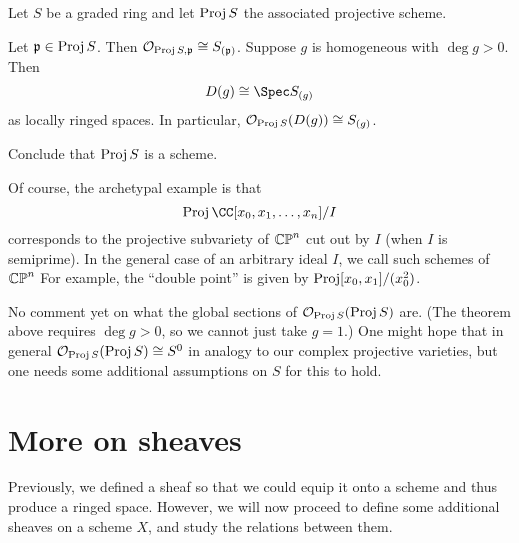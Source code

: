 \documentclass[11pt]{scrreprt}
\begin{document}
\begin{theorem}
	Let $S$ be a graded ring and let $\operatorname{Proj} S$ the associated projective scheme.
	\begin{enumerate}[(a)]
		\ii Let $\mathfrak p \in \operatorname{Proj} S$.
		Then $\mathcal O_{\operatorname{Proj} S, \mathfrak p} \cong S_{(\mathfrak p)}$.
		\ii Suppose $g$ is homogeneous with $\deg g > 0$. Then
		\[ D(g) \cong \Spec S_{(g)} \]
		as locally ringed spaces.
		In particular, $\mathcal O_{\operatorname{Proj} S}(D(g)) \cong S_{(g)}$.
	\end{enumerate}
\end{theorem}
\begin{ques}
	Conclude that $\operatorname{Proj} S$ is a scheme.
\end{ques}

Of course, the archetypal example is that
\[ \Proj \CC[x_0, x_1, \dots, x_n] / I \]
corresponds to the projective subvariety of $\mathbb{CP}^n$
cut out by $I$ (when $I$ is semiprime).
In the general case of an arbitrary ideal $I$, we
call such schemes  of $\mathbb{CP}^n$
For example, the ``double point'' is given by $\operatorname{Proj}[x_0,x_1]/(x_0^2)$.

\begin{remark}
	No comment yet on what the global sections of $\mathcal O_{\operatorname{Proj} S}(\operatorname{Proj} S)$ are.
	(The theorem above requires $\deg g > 0$, so we cannot just take $g=1$.)
	One might hope that in general $\mathcal O_{\operatorname{Proj} S}(\operatorname{Proj} S) \cong S^0$
	in analogy to our complex projective varieties, but
	one needs some additional assumptions on $S$ for this to hold.
\end{remark}

\chapter{More on sheaves}
Previously, we defined a sheaf so that we could equip
it onto a scheme and thus produce a ringed space.
However, we will now proceed to define some additional sheaves on a scheme $X$,
and study the relations between them.
\end{document}

